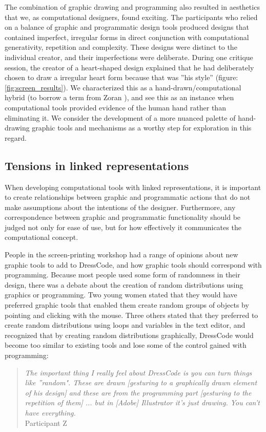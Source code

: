 \documentclass{sigchi}
\begin{document}
The combination of graphic drawing and programming also resulted in aesthetics that we, as computational designers, found exciting. The participants who relied on a balance of graphic and programmatic design tools produced designs that contained imperfect, irregular forms in direct conjunction with computational generativity, repetition and complexity. These designs were distinct to the individual creator, and their imperfections were deliberate. During one critique session, the creator of a heart-shaped design explained that he had deliberately chosen to draw a irregular heart form because that was ”his style” (figure:\ref{fig:screen_results}). We characterized this as a hand-drawn/computational hybrid (to borrow a term from Zoran \cite{zoran_thesis}), and see this as an instance when computational tools provided evidence of the human hand rather than eliminating it. We consider the development of a more nuanced palette of hand-drawing graphic tools and mechanisms as a worthy step for exploration in this regard.

\subsection{Tensions in linked representations}
 When developing computational tools with linked representations, it is important to create relationships between graphic and programmatic actions that do not make assumptions about the intentions of the designer. Furthermore, any correspondence between graphic and programmatic functionality should be judged not only for ease of use, but for how effectively it communicates the computational concept.

People in the screen-printing workshop had a range of opinions about new graphic tools to add to DressCode, and how graphic tools should correspond with programming. Because most people used some form of randomness in their design, there was a debate about the creation of random distributions using graphics or programming. Two young women stated that they would have preferred graphic tools that enabled them create random groups of objects by pointing and clicking with the mouse. Three others stated that they preferred to create random distributions using loops and variables in the text editor, and recognized that by creating random distributions graphically, DressCode would become too similar to existing tools and lose some of the control gained with programming:
\begin{quote}
\textit{The important thing I really feel about DressCode is you can turn things like ''random". These are drawn [gesturing to a graphically drawn element of his design] and these are from the programming part [gesturing to the repetition of them] ... but in [Adobe] Illustrator it's just drawing. You can't have everything.}
\\Participant Z
\end{quote}
\end{document}
